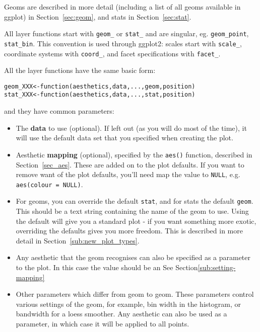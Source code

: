 Geoms are described in more detail (including a list of all geoms available in ggplot) in Section~\ref{sec:geom}, and stats in Section~\ref{sec:stat}.

All layer functions start with {\tt geom\_} or {\tt stat\_} and are singular, eg. {\tt geom\_point}, {\tt stat\_bin}.  This convention is used through ggplot2: scales start with {\tt scale\_}, coordinate systems with {\tt coord\_}, and facet specifications with {\tt facet\_}.

All the layer functions have the same basic form:

\begin{alltt}
geom_XXX <- function(aesthetics, data, ..., geom, position) {}
stat_XXX <- function(aesthetics, data, ..., stat, position) {}
\end{alltt}

\noindent and they have common parameters:

\begin{itemize}
	\item The {\bf data} to use (optional).  If left out (as you will do most of the time), it will use the default data set that you specified when creating the plot.  

	\item Aesthetic {\bf mapping} (optional), specified by the {\tt aes()} function, described in Section~\ref{sec_aes}.  These are added on to the plot defaults.  If you want to remove want of the plot defaults, you'll need map the value to {\tt NULL}, e.g. {\tt aes(colour = NULL)}.
	
	\item For geoms, you can override the default {\tt stat}, and for stats the default {\tt geom}.  This should be a text string containing the name of the geom to use.  Using the default will give you a standard plot - if you want something more exotic, overriding the defaults gives you more freedom.  This is described in more detail in Section~\ref{sub:new_plot_types}.
	
	\item Any aesthetic that the geom recognises can also be specified as a parameter to the plot.  In this case the value should be an See Section\ref{sub:setting-mapping}

	\item Other parameters which differ from geom to geom.  These parameters control various settings of the geom, for example, bin width in the histogram, or bandwidth for a loess smoother.  Any aesthetic can also be used as a parameter, in which case it will be applied to all points.
\end{itemize}


